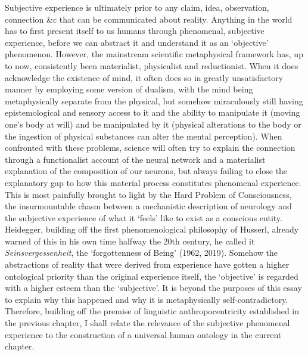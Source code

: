 Subjective experience is ultimately prior to any claim, idea, observation, connection \&c that can be communicated about reality. Anything in the world has to first present itself to us humans through phenomenal, subjective experience, before we can abstract it and understand it as an ‘objective’ phenomenon. However, the mainstream scientific metaphysical framework has, up to now, consistently been materialist, physicalist and reductionist. When it does acknowledge the existence of mind, it often does so in greatly unsatisfactory manner by employing some version of dualism, with the mind being metaphysically separate from the physical, but somehow miraculously still having epistemological and sensory access to it and the ability to manipulate it (moving one’s body at will) and be manipulated by it (physical alterations to the body or the ingestion of physical substances can alter the mental perception). When confronted with these problems, science will often try to explain the connection through a functionalist account of the neural network and a materialist explanation of the composition of our neurons, but always failing to close the explanatory gap to how this material process constitutes phenomenal experience. This is most painfully brought to light by the Hard Problem of Consciousness, the insurmountable chasm between a mechanistic description of neurology and the subjective experience of what it ‘feels’ like to exist as a conscious entity. Heidegger, building off the first phenomenological philosophy of Husserl, already warned of this in his own time halfway the 20th century, he called it \textit{Seinsvergessenheit}, the ‘forgottenness of Being’ (1962, 2019). Somehow the abstractions of reality that were derived from experience have gotten a higher ontological priority than the original experience itself, the ‘objective’ is regarded with a higher esteem than the ‘subjective’. It is beyond the purposes of this essay to explain why this happened and why it is metaphysically self-contradictory. Therefore, building off the premise of linguistic anthropocentricity established in the previous chapter, I shall relate the relevance of the subjective phenomenal experience to the construction of a universal human ontology in the current chapter. 

